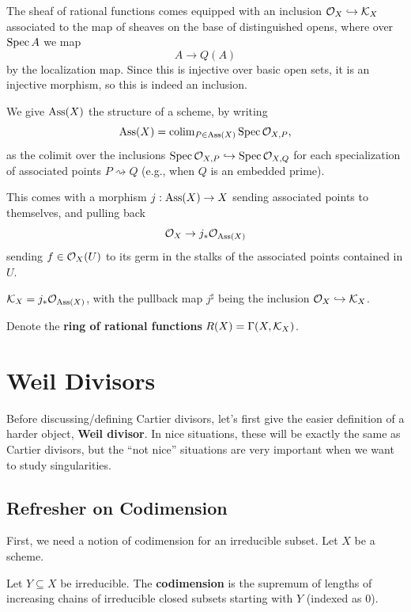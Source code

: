 \documentclass[12pt]{article}
\begin{document}
\begin{rmk}
    The sheaf of rational functions comes equipped with an inclusion $\mathcal{O}_X \hookrightarrow \mathcal{K}_X$ associated to the map of sheaves on the base of distinguished opens, where over $\operatorname{Spec} A$ we map
    \[A \to Q(A)\]
    by the localization map. Since this is injective over basic open sets, it is an injective morphism, so this is indeed an inclusion.
\end{rmk}

\begin{defn}
    We give $\operatorname{Ass}(X)$ the structure of a scheme, by writing
    \[\operatorname{Ass}(X) = \mathrm{colim}_{P\in \operatorname{Ass}(X)} \operatorname{Spec} \mathcal{O}_{X,P},\]
    as the colimit over the inclusions $\operatorname{Spec} \mathcal{O}_{X,P} \hookrightarrow \operatorname{Spec} \mathcal{O}_{X,Q}$ for each specialization of associated points $P\rightsquigarrow Q$ (e.g., when $Q$ is an embedded prime).

    This comes with a morphism $j: \operatorname{Ass}(X) \to X$ sending associated points to themselves, and pulling back
    \[\mathcal{O}_X \to j_* \mathcal{O}_{\operatorname{Ass}(X)}\]
    sending $f\in \mathcal{O}_X(U)$ to its germ in the stalks of the associated points contained in $U$.
\end{defn}

\begin{prop}
    $\mathcal{K}_X = j_* \mathcal{O}_{\operatorname{Ass}(X)}$, with the pullback map $j^\sharp$ being the inclusion $\mathcal{O}_X\hookrightarrow \mathcal{K}_X$.
\end{prop}

\begin{defn}
    Denote the \textbf{ring of rational functions} $R(X) = \Gamma(X,\mathcal{K}_X)$.
\end{defn}

\section{Weil Divisors}

Before discussing/defining Cartier divisors, let's first give the easier definition of a harder object, \textbf{Weil divisor}. In nice situations, these will be exactly the same as Cartier divisors, but the ``not nice'' situations are very important when we want to study singularities.

\subsection{Refresher on Codimension}

First, we need a notion of codimension for an irreducible subset. Let $X$ be a scheme.
\begin{defn}
    Let $Y\subseteq X$ be irreducible. The \textbf{codimension} is the supremum of lengths of increasing chains of irreducible closed subsets starting with $Y$ (indexed as $0$).
\end{defn}
\end{document}
